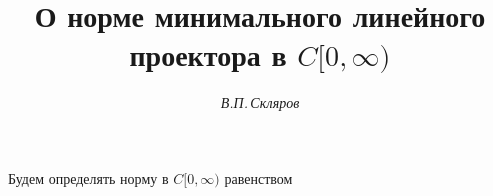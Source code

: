 









\newcommand{\tts}[1]{}







\setcounter{page}{31}















\author{\it В.П.\,Скляров}




\title{О норме минимального линейного проектора в $C[0,\infty)$}





\date{}




\pagestyle{plain} %







\maketitle


\label{begin}





Будем определять норму в $C[0,\infty)$ равенством


